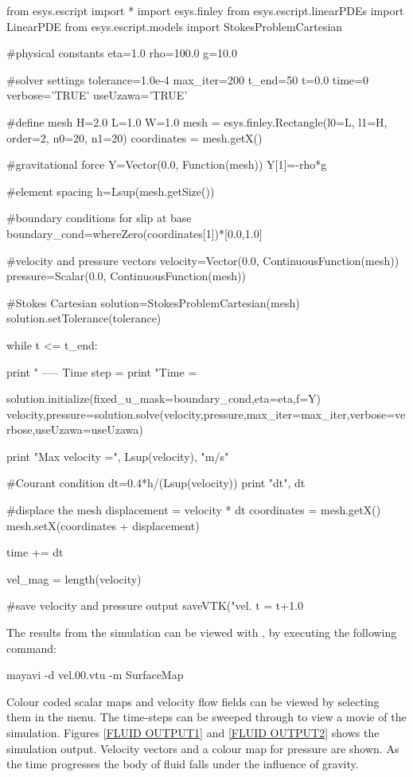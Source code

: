 \begin{python}
from esys.escript import *
import esys.finley
from esys.escript.linearPDEs import LinearPDE
from esys.escript.models import StokesProblemCartesian

#physical constants
eta=1.0
rho=100.0
g=10.0 

#solver settings
tolerance=1.0e-4
max_iter=200
t_end=50
t=0.0
time=0
verbose='TRUE'
useUzawa='TRUE'

#define mesh 
H=2.0
L=1.0
W=1.0
mesh = esys.finley.Rectangle(l0=L, l1=H, order=2, n0=20, n1=20)
coordinates = mesh.getX()

#gravitational force
Y=Vector(0.0, Function(mesh))
Y[1]=-rho*g

#element spacing
h=Lsup(mesh.getSize())

#boundary conditions for slip at base
boundary_cond=whereZero(coordinates[1])*[0.0,1.0]

#velocity and pressure vectors
velocity=Vector(0.0, ContinuousFunction(mesh))
pressure=Scalar(0.0, ContinuousFunction(mesh))

#Stokes Cartesian
solution=StokesProblemCartesian(mesh)
solution.setTolerance(tolerance)

while t <= t_end:

  print " ----- Time step = %
  print "Time = %
 
  solution.initialize(fixed_u_mask=boundary_cond,eta=eta,f=Y)
  velocity,pressure=solution.solve(velocity,pressure,max_iter=max_iter,verbose=verbose,useUzawa=useUzawa)
  
  print "Max velocity =", Lsup(velocity), "m/s"
  
  #Courant condition
  dt=0.4*h/(Lsup(velocity))
  print "dt", dt 
  
  #displace the mesh
  displacement = velocity * dt
  coordinates = mesh.getX()
  mesh.setX(coordinates + displacement)  
  
  time += dt
  
  vel_mag = length(velocity)

  #save velocity and pressure output
  saveVTK("vel.%
  t = t+1.0

\end{python}

The results from the simulation can be viewed with \mayavi, by executing the following command:
%
\begin{python}
mayavi -d vel.00.vtu -m SurfaceMap
\end{python}
%
Colour coded scalar maps and velocity flow fields can be viewed by selecting them in the menu. The time-steps can be sweeped through to view a movie of the simulation.
Figures \ref{FLUID OUTPUT1} and \ref{FLUID OUTPUT2} shows the simulation output. Velocity vectors and a colour map for pressure are shown. As the time progresses the body of fluid falls under the influence of gravity. 
 
